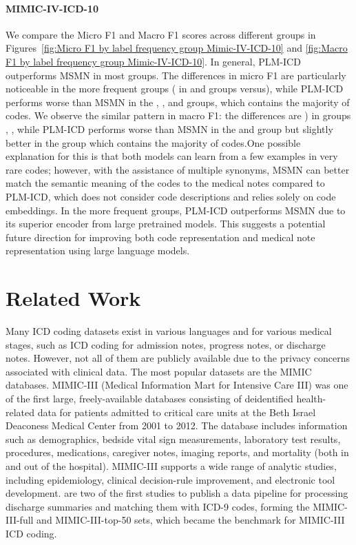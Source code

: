 \documentclass[11pt]{article}
\begin{document}
\paragraph{MIMIC-IV-ICD-10}
We compare the Micro F1 and Macro F1 scores across different groups in Figures~\ref{fig:Micro F1 by label frequency group Mimic-IV-ICD-10} and \ref{fig:Macro F1 by label frequency group Mimic-IV-ICD-10}. In general, PLM-ICD outperforms MSMN in most groups. The differences in micro F1 are particularly noticeable in the more frequent groups ( in  and  groups versus), while PLM-ICD performs worse than MSMN in the , , and  groups, which contains the majority of codes. We observe the similar pattern in macro F1: the differences are ) in groups , , while PLM-ICD performs worse than MSMN in the  and  group but slightly better in the  group which contains the majority of codes.One possible explanation for this is that both models can learn from a few examples in very rare codes; however, with the assistance of multiple synonyms, MSMN can better match the semantic meaning of the codes to the medical notes compared to PLM-ICD, which does not consider code descriptions and relies solely on code embeddings. In the more frequent groups, PLM-ICD outperforms MSMN due to its superior encoder from large pretrained models. This suggests a potential future direction for improving both code representation and medical note representation using large language models.

\section{Related Work}

Many ICD coding datasets exist in various languages and for various medical stages, such as ICD coding for admission notes, progress notes, or discharge notes. However, not all of them are publicly available due to the privacy concerns associated with clinical data. The most popular datasets are the MIMIC databases. MIMIC-III (Medical Information Mart for Intensive Care III) was one of the first large, freely-available databases consisting of deidentified health-related data for patients admitted to critical care units at the Beth Israel Deaconess Medical Center from 2001 to 2012. The database includes information such as demographics, bedside vital sign measurements, laboratory test results, procedures, medications, caregiver notes, imaging reports, and mortality (both in and out of the hospital). MIMIC-III supports a wide range of analytic studies, including epidemiology, clinical decision-rule improvement, and electronic tool development. \citep{mullenbach-etal-2018-explainable, shi-et-al-2027-automated-icd} are two of the first studies to publish a data pipeline for processing discharge summaries and matching them with ICD-9 codes, forming the MIMIC-III-full and MIMIC-III-top-50 sets, which became the benchmark for MIMIC-III ICD coding.
\end{document}
